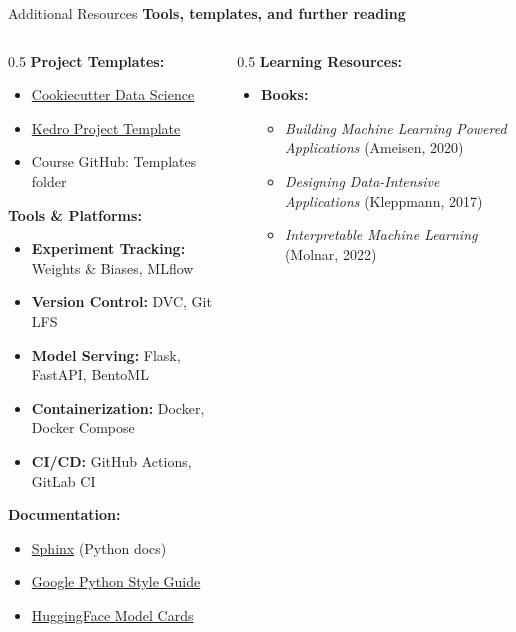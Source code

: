 
\begin{frame}{Additional Resources}
\textbf{Tools, templates, and further reading}

\begin{columns}
\begin{column}{0.5\textwidth}
\textbf{Project Templates:}
\begin{itemize}
\item \href{https://github.com/drivendata/cookiecutter-data-science}{Cookiecutter Data Science}
\item \href{https://github.com/khuyentran1401/data-science-template}{Kedro Project Template}
\item Course GitHub: Templates folder
\end{itemize}

\vspace{0.3cm}

\textbf{Tools \& Platforms:}
\begin{itemize}
\item \textbf{Experiment Tracking:} Weights \& Biases, MLflow
\item \textbf{Version Control:} DVC, Git LFS
\item \textbf{Model Serving:} Flask, FastAPI, BentoML
\item \textbf{Containerization:} Docker, Docker Compose
\item \textbf{CI/CD:} GitHub Actions, GitLab CI
\end{itemize}

\vspace{0.3cm}

\textbf{Documentation:}
\begin{itemize}
\item \href{https://www.sphinx-doc.org/}{Sphinx} (Python docs)
\item \href{https://github.com/google/styleguide/blob/gh-pages/pyguide.md}{Google Python Style Guide}
\item \href{https://github.com/huggingface/model_card}{HuggingFace Model Cards}
\end{itemize}
\end{column}

\begin{column}{0.5\textwidth}
\textbf{Learning Resources:}

\begin{itemize}
\item \textbf{Books:}
   \begin{itemize}
   \item \textit{Building Machine Learning Powered Applications} (Ameisen, 2020)
   \item \textit{Designing Data-Intensive Applications} (Kleppmann, 2017)
   \item \textit{Interpretable Machine Learning} (Molnar, 2022)
   \end{itemize}


\end{itemize}
\end{column}
\end{columns}
\end{frame}
